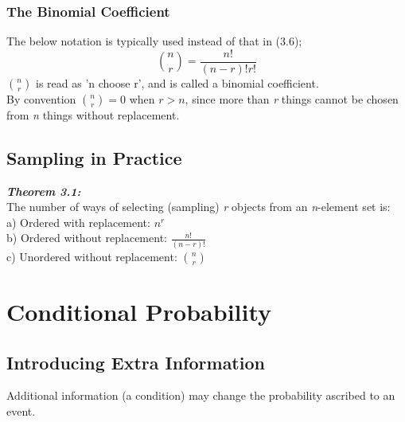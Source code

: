 \documentclass{report}
\newenvironment{cframed2}[1][PineGreen]
  {\begin{tcolorbox}[colframe=#1,colback=white]}
  {\end{tcolorbox}}
\begin{document}
\subsection{The Binomial Coefficient}
The below notation is typically used instead of that in (3.6);
\begin{equation}
    \binom{n}{r} = \frac{n!}{(n-r)! r!}
\end{equation}
$\binom{n}{r}$ is read as 'n choose r', and is called a binomial coefficient.\\
By convention $\binom{n}{r} = 0$ when $r > n$, since more than \textit{r} things cannot be chosen from \textit{n} things without replacement.

\section{Sampling in Practice}

\begin{cframed2}
\textcolor{PineGreen}{\textit{\textbf{Theorem 3.1:}}}\\
\textcolor{PineGreen}{The number of ways of selecting (sampling) \textit{r} objects from an \textit{n}-element set is:}\\

\textcolor{PineGreen}{a) Ordered with replacement: $n^r$}\\

\textcolor{PineGreen}{b) Ordered without replacement: $ \frac{n!}{(n-r)!} $}\\

\textcolor{PineGreen}{c) Unordered without replacement: $\binom{n}{r}$}
\end{cframed2}

\chapter{Conditional Probability}
\section{Introducing Extra Information}

Additional information (a condition) may change the probability ascribed to an event.\\
\end{document}
